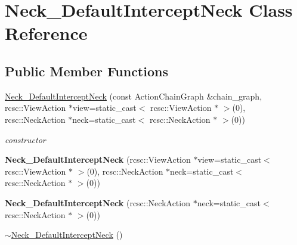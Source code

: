 \hypertarget{classNeck__DefaultInterceptNeck}{
\section{Neck\_\-DefaultInterceptNeck Class Reference}
\label{classNeck__DefaultInterceptNeck}
}
\subsection*{Public Member Functions}
\begin{DoxyCompactItemize}
\item 
\hypertarget{classNeck__DefaultInterceptNeck_afa1bf98813c14c167a31d960ef083239}{
\hyperlink{classNeck__DefaultInterceptNeck_afa1bf98813c14c167a31d960ef083239}{Neck\_\-DefaultInterceptNeck} (const ActionChainGraph \&chain\_\-graph, rcsc::ViewAction $\ast$view=static\_\-cast$<$ rcsc::ViewAction $\ast$ $>$(0), rcsc::NeckAction $\ast$neck=static\_\-cast$<$ rcsc::NeckAction $\ast$ $>$(0))}
\label{classNeck__DefaultInterceptNeck_afa1bf98813c14c167a31d960ef083239}

\begin{DoxyCompactList}\small\item\em constructor \item\end{DoxyCompactList}\item 
\hypertarget{classNeck__DefaultInterceptNeck_a938f2f16997e2e748e99d0dd95f2c082}{
{\bfseries Neck\_\-DefaultInterceptNeck} (rcsc::ViewAction $\ast$view=static\_\-cast$<$ rcsc::ViewAction $\ast$ $>$(0), rcsc::NeckAction $\ast$neck=static\_\-cast$<$ rcsc::NeckAction $\ast$ $>$(0))}
\label{classNeck__DefaultInterceptNeck_a938f2f16997e2e748e99d0dd95f2c082}

\item 
\hypertarget{classNeck__DefaultInterceptNeck_a3f886a404acf7a5e0c58f53645d52272}{
{\bfseries Neck\_\-DefaultInterceptNeck} (rcsc::NeckAction $\ast$neck=static\_\-cast$<$ rcsc::NeckAction $\ast$ $>$(0))}
\label{classNeck__DefaultInterceptNeck_a3f886a404acf7a5e0c58f53645d52272}

\item 
\hypertarget{classNeck__DefaultInterceptNeck_aba15a957666f884ca67b9b6f3021f986}{
\hyperlink{classNeck__DefaultInterceptNeck_aba15a957666f884ca67b9b6f3021f986}{$\sim$Neck\_\-DefaultInterceptNeck} ()}
\label{classNeck__DefaultInterceptNeck_aba15a957666f884ca67b9b6f3021f986}


\end{DoxyCompactItemize}

